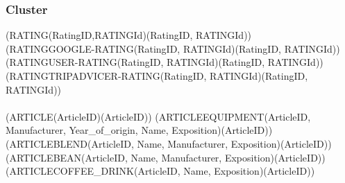 \subsubsection{Cluster}
(RATING(RatingID,RATINGId)(RatingID, RATINGId))\\
(RATINGGOOGLE-RATING(RatingID, RATINGId)(RatingID, RATINGId))\\
(RATINGUSER-RATING(RatingID, RATINGId)(RatingID, RATINGId))\\
(RATINGTRIPADVICER-RATING(RatingID, RATINGId)(RatingID, RATINGId))\\\\
(ARTICLE(ArticleID)(ArticleID))
(ARTICLEEQUIPMENT(ArticleID, Manufacturer, Year\_of\_origin, Name, Exposition)(ArticleID))\\
(ARTICLEBLEND(ArticleID, Name, Manufacturer, Exposition)(ArticleID))\\
(ARTICLEBEAN(ArticleID, Name, Manufacturer, Exposition)(ArticleID))\\
(ARTICLECOFFEE\_DRINK(ArticleID, Name, Exposition)(ArticleID))\\
